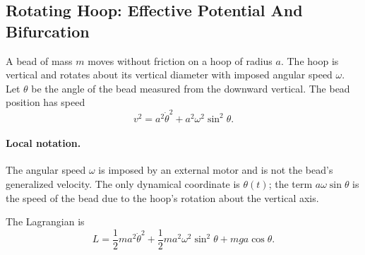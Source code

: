 \subsection{Rotating Hoop: Effective Potential And Bifurcation}
\label{sec:lab-rotating-hoop}

A bead of mass \(m\) moves without friction on a hoop of radius \(a\). The hoop
is vertical and rotates about its vertical diameter with imposed angular speed
\(\omega\). Let \(\theta\) be the angle of the bead measured from the downward
vertical. The bead position has speed
\[
  v^2=a^2\dot\theta^2+a^2\omega^2\sin^2\theta.
\]

\paragraph{Local notation.}
The angular speed \(\omega\) is imposed by an external motor and is not the
bead's generalized velocity.  The only dynamical coordinate is \(\theta(t)\);
the term \(a\omega\sin\theta\) is the speed of the bead due to the hoop's
rotation about the vertical axis.

The Lagrangian is
\[
  L
  =
  \frac12ma^2\dot\theta^2
  +
  \frac12ma^2\omega^2\sin^2\theta
  +
  mga\cos\theta.
\]

